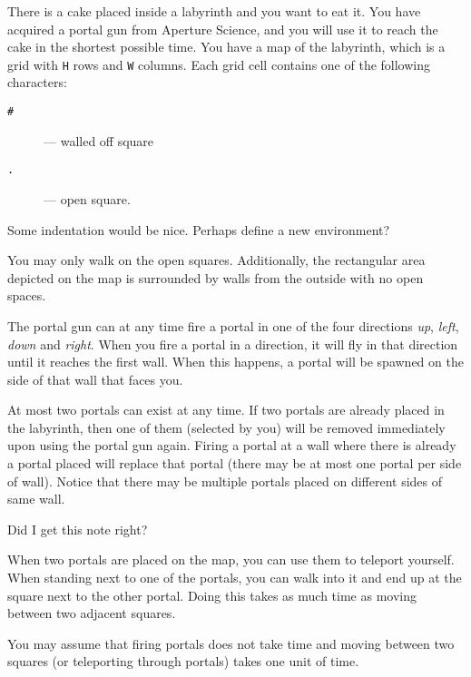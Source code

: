 \documentclass{boi2014}
\newcommand{\param}[1]{{\tt #1}}
\newcommand{\constant}[1]{{\tt #1}}
\begin{document}
    There is a cake placed inside a labyrinth and you want
    to eat it. You have acquired a portal gun from
    Aperture Science\texttrademark, and you will use it to reach
    the cake in the shortest possible time. You
    have a map of the labyrinth, which is a grid with \param{H}
    rows and \param{W} columns. Each grid cell contains one
    of the following characters:

    \begin{description}
        \item[\constant{\#}] --- walled off square
        \item[\constant{.}] --- open square.
    \end{description}

    \begin{todo}
        Some indentation would be nice. Perhaps define a new
        environment?
    \end{todo}

    You may only walk on the open squares. Additionally, the rectangular
    area depicted on the map is surrounded by walls from the outside
    with no open spaces.

    The portal gun can at any time fire a portal in one of the four
    directions \emph{up}, \emph{left}, \emph{down} and \emph{right}.
    When you fire a portal in a direction, it will fly in that direction
    until it reaches the first wall. When this happens, a portal
    will be spawned on the side of that wall that faces you.

    At most two portals can exist at any time. If two portals
    are already placed in the labyrinth, then one of them (selected
    by you) will be removed immediately upon using the portal gun
    again. Firing a portal at a wall where there is already a portal
    placed will replace that portal (there may be at most one portal
    per side of wall). Notice that there may be multiple portals placed
    on different sides of same wall.

    \begin{todo}
        Did I get this note right?
    \end{todo}

    When two portals are placed on the map, you can use them to
    teleport yourself. When standing next to one of the portals,
    you can walk into it and end up at the square next to the other
    portal. Doing this takes as much time as moving between two
    adjacent squares.

    You may assume that firing portals does not take time and moving
    between two squares (or teleporting through portals) takes one unit
    of time.
\end{document}
